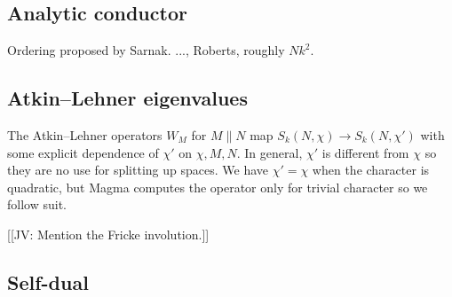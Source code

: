 \documentclass[11pt]{amsart}
\numberwithin{equation}{subsection}
\theoremstyle{plain}
\theoremstyle{definition}
\newcommand{\jv}[1]{{\color{red} \textsf{[[JV: #1]]}}}
\begin{document}
\subsection{Analytic conductor}

Ordering proposed by Sarnak.  ..., Roberts, roughly $Nk^2$.  

\subsection{Atkin--Lehner eigenvalues}

The Atkin--Lehner operators $W_M$ for $M \parallel N$ map $S_k(N,\chi) \to S_k(N,\chi')$ with some explicit dependence of $\chi'$ on $\chi, M, N$.  In general, $\chi'$ is different from $\chi$ so they are no use for splitting up spaces.  We have $\chi'=\chi$ when the character is quadratic, but Magma computes the operator only for trivial character so we follow suit.  

\jv{Mention the Fricke involution.}

\subsection{Self-dual}
\end{document}
